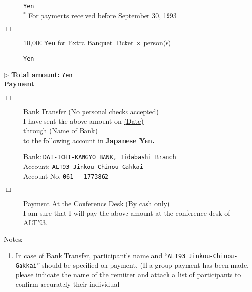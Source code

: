 \begin{small}
\begin{description}
\hfill \underline{\hspace{30mm}} {\tt Yen}\\
\hfill {\footnotesize $^*$ For payments received \underline{before} September 30, 1993}
\item [$\Box$] 10,000 {\tt Yen} for Extra Banquet Ticket
$\times$ \underline{\hspace{8mm}} person(s)\par
\hfill  \underline{\hspace{30mm}} {\tt Yen}
\end{description}
\hspace{25mm} $\rhd$ {\bf Total amount:}
\hfill  \underline{\hspace{30mm}} {\tt Yen}\vspace{3mm}\\
\noindent
{\normalsize {\bf Payment}}
\begin{description}
\item [$\Box$] Bank Transfer (No personal checks accepted)\\
I have sent the above amount on \underline{{\footnotesize (Date)} \hspace{20mm}}\\
\noindent
through \underline{{\footnotesize (Name of Bank)} \hspace{43mm}}\\
\noindent
to the following account in {\bf Japanese Yen.}\vspace{-1.0mm}
\begin{center}
Bank: {\tt DAI-ICHI-KANGYO BANK, Iidabashi Branch}\\
Account: {\tt ALT93 Jinkou-Chinou-Gakkai}\\
Account No. {\tt 061 - 1773862}\vspace{-1.0mm}
\end{center}
\item [$\Box$] Payment At the Conference Desk (By cash only)\\
I am sure that I will pay the above amount at the conference desk of
ALT'93.
\end{description}
\vspace{1mm}
{\small
\noindent
Notes:
\begin{enumerate}
\item In case of Bank Transfer, participant's name and ``{\tt ALT93
Jinkou-Chinou-Gakkai}'' should be specified on payment. (If a group
payment has been made, please indicate the name of the remitter and
attach a list of participants to confirm accurately their individual

\end{enumerate}}
\end{small}
